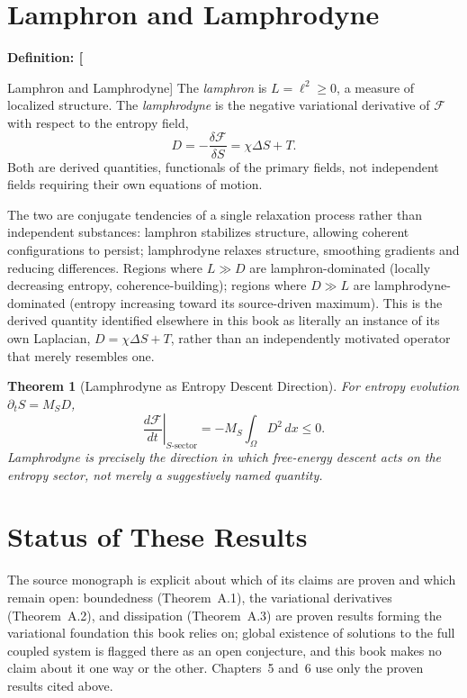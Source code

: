 \documentclass[11pt,fleqn]{book}
\numberwithin{equation}{chapter}
\newenvironment{definition}[1]
  {\begin{definitionEnv}
   \noindent\textbf{Definition: #1}\par\smallskip}
  {\end{definitionEnv}}
\theoremstyle{plain}
\newtheorem{theorem}{Theorem}[chapter]
\theoremstyle{definition}
\theoremstyle{remark}
\begin{document}
\section{Lamphron and Lamphrodyne}

\begin{definition}[Lamphron and Lamphrodyne]
The \emph{lamphron} is \(L=\ell^2\geq 0\), a measure of localized structure. The \emph{lamphrodyne} is the negative variational derivative of \(\mathcal F\) with respect to the entropy field,
\[
D = -\frac{\delta\mathcal F}{\delta S} = \chi\Delta S + T.
\]
Both are derived quantities, functionals of the primary fields, not independent fields requiring their own equations of motion.
\end{definition}

The two are conjugate tendencies of a single relaxation process rather than independent substances: lamphron stabilizes structure, allowing coherent configurations to persist; lamphrodyne relaxes structure, smoothing gradients and reducing differences. Regions where \(L\gg D\) are lamphron-dominated (locally decreasing entropy, coherence-building); regions where \(D\gg L\) are lamphrodyne-dominated (entropy increasing toward its source-driven maximum). This is the derived quantity identified elsewhere in this book as literally an instance of its own Laplacian, \(D=\chi\Delta S+T\), rather than an independently motivated operator that merely resembles one.

\begin{theorem}[Lamphrodyne as Entropy Descent Direction]
For entropy evolution \(\partial_t S = M_S D\),
\[
\left.\frac{d\mathcal F}{dt}\right|_{S\text{-sector}} = -M_S\int_\Omega D^2\,dx \leq 0.
\]
Lamphrodyne is precisely the direction in which free-energy descent acts on the entropy sector, not merely a suggestively named quantity.
\end{theorem}

\section{Status of These Results}

The source monograph is explicit about which of its claims are proven and which remain open: boundedness (Theorem~A.1), the variational derivatives (Theorem~A.2), and dissipation (Theorem~A.3) are proven results forming the variational foundation this book relies on; global existence of solutions to the full coupled system is flagged there as an open conjecture, and this book makes no claim about it one way or the other. Chapters~5 and~6 use only the proven results cited above.
\end{document}
